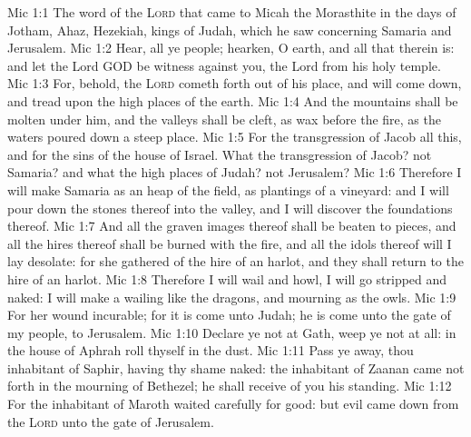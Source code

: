 \vs Mic 1:1 The word of the \textsc{Lord} that came to Micah the Morasthite in the days of Jotham, Ahaz,  Hezekiah, kings of Judah, which he saw concerning Samaria and Jerusalem.
\vs Mic 1:2 Hear, all ye people; hearken, O earth, and all that therein is: and let the Lord GOD be witness against you, the Lord from his holy temple.
\vs Mic 1:3 For, behold, the \textsc{Lord} cometh forth out of his place, and will come down, and tread upon the high places of the earth.
\vs Mic 1:4 And the mountains shall be molten under him, and the valleys shall be cleft, as wax before the fire,  as the waters  poured down a steep place.
\vs Mic 1:5 For the transgression of Jacob  all this, and for the sins of the house of Israel. What  the transgression of Jacob?  not Samaria? and what  the high places of Judah?  not Jerusalem?
\vs Mic 1:6 Therefore I will make Samaria as an heap of the field,  as plantings of a vineyard: and I will pour down the stones thereof into the valley, and I will discover the foundations thereof.
\vs Mic 1:7 And all the graven images thereof shall be beaten to pieces, and all the hires thereof shall be burned with the fire, and all the idols thereof will I lay desolate: for she gathered  of the hire of an harlot, and they shall return to the hire of an harlot.
\vs Mic 1:8 Therefore I will wail and howl, I will go stripped and naked: I will make a wailing like the dragons, and mourning as the owls.
\vs Mic 1:9 For her wound  incurable; for it is come unto Judah; he is come unto the gate of my people,  to Jerusalem.
\vs Mic 1:10 Declare ye  not at Gath, weep ye not at all: in the house of Aphrah roll thyself in the dust.
\vs Mic 1:11 Pass ye away, thou inhabitant of Saphir, having thy shame naked: the inhabitant of Zaanan came not forth in the mourning of Bethezel; he shall receive of you his standing.
\vs Mic 1:12 For the inhabitant of Maroth waited carefully for good: but evil came down from the \textsc{Lord} unto the gate of Jerusalem.
